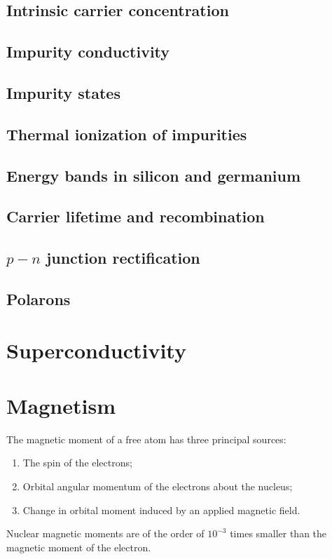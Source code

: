\section{Intrinsic carrier concentration}
\section{Impurity conductivity}
\section{Impurity states}
\section{Thermal ionization of impurities}
\section{Energy bands in silicon and germanium}
\section{Carrier lifetime and recombination}
\section{$p-n$ junction rectification}
\section{Polarons}

\chapter{Superconductivity}

\chapter{Magnetism}
The magnetic moment of a free atom has three principal sources:
\begin{enumerate}
\item The spin of the electrons;
\item Orbital angular momentum of the electrons about the nucleus;
\item Change in orbital moment induced by an applied magnetic field.
\end{enumerate}
Nuclear magnetic moments are of the order of $10^{-3}$ times smaller than the magnetic moment of the electron.

